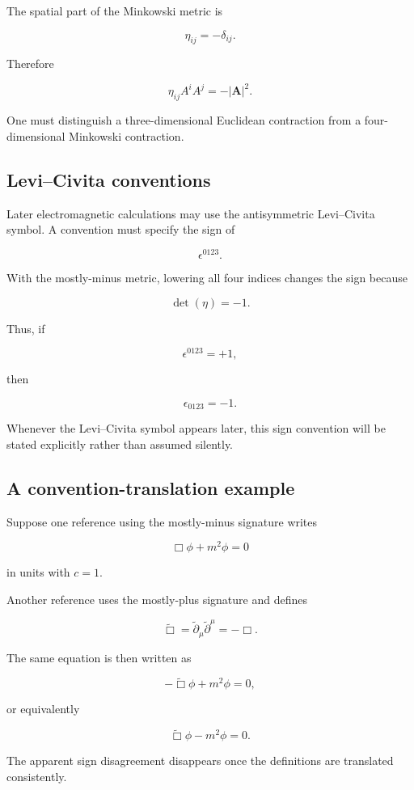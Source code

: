 The spatial part of the Minkowski metric is

\[
\eta_{ij}=-\delta_{ij}.
\]

Therefore

\[
\eta_{ij}A^{i}A^{j}
=
-|\mathbf{A}|^{2}.
\]

One must distinguish a three-dimensional Euclidean contraction from a four-dimensional Minkowski contraction.

\subsection{Levi--Civita conventions}

Later electromagnetic calculations may use the antisymmetric Levi--Civita symbol. A convention must specify the sign of

\[
\epsilon^{0123}.
\]

With the mostly-minus metric, lowering all four indices changes the sign because

\[
\det(\eta)=-1.
\]

Thus, if

\[
\epsilon^{0123}=+1,
\]

then

\[
\epsilon_{0123}=-1.
\]

Whenever the Levi--Civita symbol appears later, this sign convention will be stated explicitly rather than assumed silently.

\subsection{A convention-translation example}

Suppose one reference using the mostly-minus signature writes

\[
\Box\phi+m^{2}\phi=0
\]

in units with \(c=1\).

Another reference uses the mostly-plus signature and defines

\[
\widetilde{\Box}
=
\widetilde{\partial}_{\mu}
\widetilde{\partial}^{\mu}
=-\Box.
\]

The same equation is then written as

\[
-\widetilde{\Box}\phi+m^{2}\phi=0,
\]

or equivalently

\[
\widetilde{\Box}\phi-m^{2}\phi=0.
\]

The apparent sign disagreement disappears once the definitions are translated consistently.

